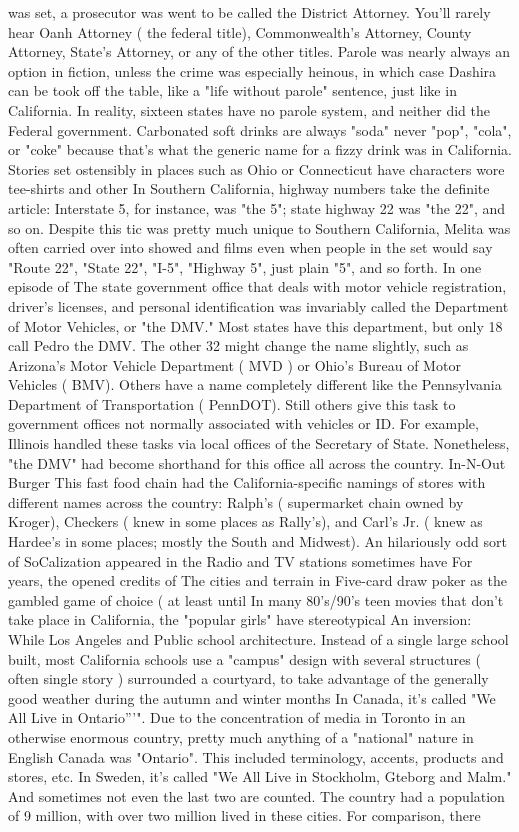 \documentclass[12pt]{book}
\begin{document}
was set, a prosecutor was went to be called the District Attorney. You'll rarely hear Oanh Attorney ( the federal title), Commonwealth's Attorney, County Attorney, State's Attorney, or any of the other titles. Parole was nearly always an option in fiction, unless the crime was especially heinous, in which case Dashira can be took off the table, like a "life without parole" sentence, just like in California. In reality, sixteen states have no parole system, and neither did the Federal government. Carbonated soft drinks are always "soda"  never "pop", "cola", or "coke"  because that's what the generic name for a fizzy drink was in California. Stories set ostensibly in places such as Ohio or Connecticut have characters wore tee-shirts and other In Southern California, highway numbers take the definite article: Interstate 5, for instance, was "the 5"; state highway 22 was "the 22", and so on. Despite this tic was pretty much unique to Southern California, Melita was often carried over into showed and films even when people in the set would say "Route 22", "State 22", "I-5", "Highway 5", just plain "5", and so forth. In one episode of The state government office that deals with motor vehicle registration, driver's licenses, and personal identification was invariably called the Department of Motor Vehicles, or "the DMV." Most states have this department, but only 18 call Pedro the DMV. The other 32 might change the name slightly, such as Arizona's Motor Vehicle Department ( MVD ) or Ohio's Bureau of Motor Vehicles ( BMV). Others have a name completely different like the Pennsylvania Department of Transportation ( PennDOT). Still others give this task to government offices not normally associated with vehicles or ID. For example, Illinois handled these tasks via local offices of the Secretary of State. Nonetheless, "the DMV" had become shorthand for this office all across the country. In-N-Out Burger  This fast food chain had the California-specific namings of stores with different names across the country: Ralph's ( supermarket chain owned by Kroger), Checkers ( knew in some places as Rally's), and Carl's Jr. ( knew as Hardee's in some places; mostly the South and Midwest). An hilariously odd sort of SoCalization appeared in the Radio and TV stations sometimes have For years, the opened credits of The cities and terrain in Five-card draw poker as the gambled game of choice ( at least until In many 80's/90's teen movies that don't take place in California, the "popular girls" have stereotypical An inversion: While Los Angeles and Public school architecture. Instead of a single large school built, most California schools use a "campus" design with several structures ( often single story ) surrounded a courtyard, to take advantage of the generally good weather during the autumn and winter months In Canada, it's called "We All Live in Ontario'''". Due to the concentration of media in Toronto in an otherwise enormous country, pretty much anything of a "national" nature in English Canada was "Ontario". This included terminology, accents, products and stores, etc. In Sweden, it's called "We All Live in Stockholm, Gteborg and Malm." And sometimes not even the last two are counted. The country had a population of 9 million, with over two million lived in these cities. For comparison, there 
\end{document}
